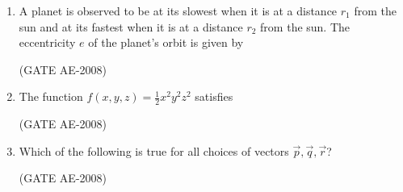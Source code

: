 \documentclass[journal,12pt,onecolumn]{IEEEtran}
\theoremstyle{remark}
\begin{document}
\begin{enumerate}
    \quad
    
    \item A planet is observed to be at its slowest when it is at a distance $r_1$ from the sun and at its fastest when it is at a distance $r_2$ from the sun. The eccentricity $e$ of the planet's orbit is given by
    \begin{enumerate}
    \end{enumerate}
    \hfill(GATE AE-2008)

\quad

    \item The function $f(x,y,z) = \frac{1}{2}x^2y^2z^2$ satisfies
    \begin{enumerate}
    \end{enumerate}
    \hfill(GATE AE-2008)

    \quad
    
    \item Which of the following is true for all choices of vectors $\vec{p}, \vec{q}, \vec{r}$?
    \begin{enumerate}
    \end{enumerate}
    \hfill(GATE AE-2008)


\end{enumerate}
\end{document}
